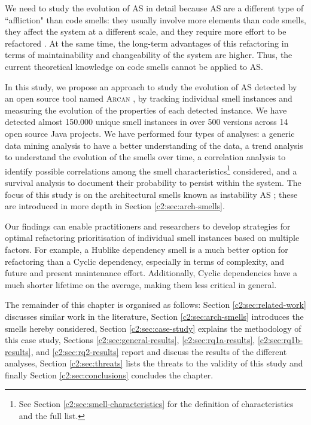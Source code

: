 We need to study the evolution of AS in detail because AS are a different type of ``affliction" than code smells: they usually involve more elements than code smells, they affect the system at a different scale, and they require more effort to be refactored \cite{Lippert2006}. At the same time,  the long-term advantages of this refactoring in terms of maintainability and changeability of the system are higher. Thus, the current theoretical knowledge on code smells cannot be applied to AS.

In this study, we propose an approach to study the evolution of AS detected by an open source tool named \textsc{Arcan} \cite{Arcelli2017}, by tracking individual smell instances and measuring the evolution of the properties of each detected instance. We have detected almost 150.000 unique smell instances in over 500 versions across 14 open source Java projects.
We have performed four types of analyses: a generic data mining analysis to have a better understanding of the data, a trend analysis to understand the evolution of the smells over time, a correlation analysis to identify possible correlations among the smell characteristics\footnote{See Section \ref{c2:sec:smell-characteristics} for the definition of characteristics and the full list.} considered, and a survival analysis to document their probability to persist within the system.
The focus of this study is on the architectural smells known as instability AS \cite{Arcelli2016}; these are introduced in more depth in Section \ref{c2:sec:arch-smells}.

Our findings can enable practitioners and researchers to develop strategies for optimal refactoring prioritisation of individual smell instances based on multiple factors.
For example, a Hublike dependency smell is a much better option for refactoring than a Cyclic dependency, especially in terms of complexity, and future and present maintenance effort.
Additionally, Cyclic dependencies have a much shorter lifetime on the average, making them less critical in general.

The remainder of this chapter is organised as follows: Section \ref{c2:sec:related-work} discusses similar work in the literature, Section \ref{c2:sec:arch-smells} introduces the smells hereby considered, Section \ref{c2:sec:case-study} explains the methodology of this case study, Sections \ref{c2:sec:general-results}, \ref{c2:sec:rq1a-results}, \ref{c2:sec:rq1b-results}, and \ref{c2:sec:rq2-results} report and discuss the results of the different analyses, Section \ref{c2:sec:threats} lists the threats to the validity of this study and finally Section \ref{c2:sec:conclusions} concludes the chapter.

